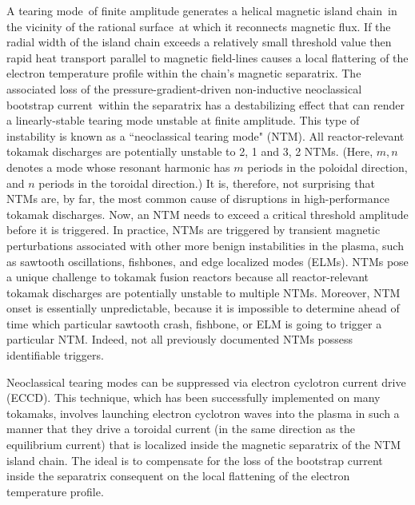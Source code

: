 \documentclass[12pt,prb,aps]{revtex4-1}
\begin{document}
A tearing mode\,\cite{tear1} of finite amplitude generates a helical magnetic island chain\,\cite{ntm1} in the vicinity of the rational surface\,\cite{ideal3} at which it reconnects magnetic flux.
If the radial width of the island chain exceeds a relatively small threshold value then rapid  heat transport parallel to magnetic field-lines causes a local flattering of the  electron temperature profile
 within the chain's magnetic separatrix.\cite{ntm2} The associated loss of the pressure-gradient-driven non-inductive neoclassical bootstrap current\,\cite{ntm3} within the separatrix
has a destabilizing effect that can render a linearly-stable tearing mode unstable at finite amplitude. This type of instability is known as a ``neoclassical tearing mode"  (NTM).  All reactor-relevant tokamak
discharges are potentially unstable  to 2, 1 and 3, 2 NTMs.\cite{ntm4,ntm5}  (Here, $m, n$ denotes a mode whose resonant harmonic has $m$ periods in the poloidal
direction, and $n$ periods in the toroidal direction.) It is, therefore, not  surprising that NTMs are, by far, the most common cause of disruptions in high-performance  tokamak
discharges.\cite{iter,ntm4,ntm5,vries}
Now, an NTM needs to exceed a critical  threshold amplitude
before it is triggered. In practice, NTMs are
triggered by transient magnetic perturbations associated with other more benign instabilities in the plasma, such as sawtooth oscillations, fishbones, and
edge localized modes (ELMs).\cite{ntm4,ntm5,sawtooth,elm} NTMs pose a unique challenge to tokamak fusion reactors  because  all reactor-relevant tokamak discharges
are potentially unstable to multiple NTMs. Moreover, NTM onset is essentially unpredictable, because it
is impossible to determine ahead of time which particular sawtooth crash, fishbone, or ELM is going to trigger a particular NTM.\cite{nstx} Indeed, not all previously documented NTMs possess identifiable
triggers.\cite{ntm6} 

Neoclassical tearing  modes can be suppressed via electron cyclotron current drive (ECCD).\cite{prater} This technique, which has been
successfully implemented on many tokamaks,\cite{eccd1,eccd2,eccd3,eccd3a,eccd4,eccd5} involves
launching electron cyclotron waves into the plasma in such a manner that they drive a toroidal current (in the same direction as the equilibrium current) that is 
localized  inside the magnetic separatrix of
the NTM island chain. The ideal is to compensate for the loss of the bootstrap current inside the separatrix consequent on the local flattening
of the electron temperature profile.\cite{ntm4,ntm5} 
\end{document}
